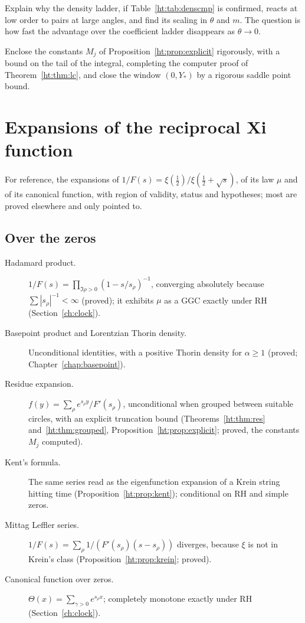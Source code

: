 \begin{problem}
Explain why the density ladder, if Table~\ref{ht:tab:denscmp} is confirmed, reacts at low order to pairs at large angles, and find its scaling in $\theta$ and $m$. The question is how fast the advantage over the coefficient ladder disappears as $\theta\to0$.
\end{problem}

\begin{problem}
Enclose the constants $M_j$ of Proposition~\ref{ht:prop:explicit} rigorously, with a bound on the tail of the integral, completing the computer proof of Theorem~\ref{ht:thm:lc}, and close the window $(0,Y_{\!*})$ by a rigorous saddle point bound.
\end{problem}

\section{Expansions of the reciprocal Xi function}\label{ht:sec:expansions}

For reference, the expansions of $1/F(s)=\xi(\frac12)/\xi(\frac12+\sqrt s)$, of its law $\mu$ and of its canonical function, with region of validity, status and hypotheses; most are proved elsewhere and only pointed to.

\subsection*{Over the zeros}
\begin{description}
\item[Hadamard product.] $1/F(s)=\prod_{\Im\rho>0}(1-s/s_\rho)^{-1}$, converging absolutely because $\sum|s_\rho|^{-1}<\infty$ (proved); it exhibits $\mu$ as a GGC exactly under RH (Section~\ref{ch:clock}).
\item[Basepoint product and Lorentzian Thorin density.] Unconditional identities, with a positive Thorin density for $\alpha\ge1$ (proved; Chapter~\ref{chap:basepoint}).
\item[Residue expansion.] $f(y)=\sum_\rho e^{s_\rho y}/F'(s_\rho)$, unconditional when grouped between suitable circles, with an explicit truncation bound (Theorems~\ref{ht:thm:res} and~\ref{ht:thm:grouped}, Proposition~\ref{ht:prop:explicit}; proved, the constants $M_j$ computed).
\item[Kent's formula.] The same series read as the eigenfunction expansion of a Krein string hitting time (Proposition~\ref{ht:prop:kent}); conditional on RH and simple zeros.
\item[Mittag Leffler series.] $1/F(s)=\sum_\rho1/(F'(s_\rho)(s-s_\rho))$ diverges, because $\xi$ is not in Krein's class (Proposition~\ref{ht:prop:krein}; proved).
\item[Canonical function over zeros.] $\Theta(x)=\sum_{\gamma>0}e^{s_\rho x}$; completely monotone exactly under RH (Section~\ref{ch:clock}).
\end{description}

